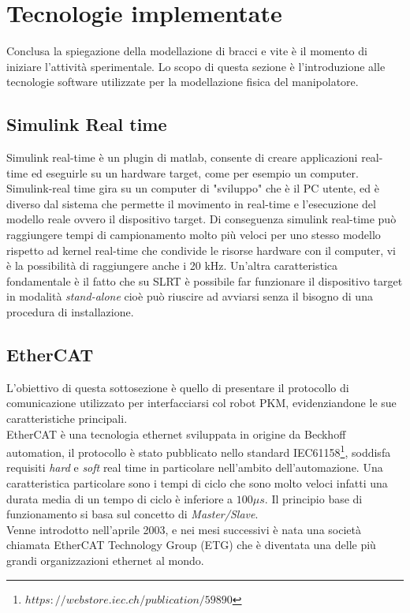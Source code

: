 \section{Tecnologie implementate}
Conclusa la spiegazione della modellazione di bracci e vite è il momento di iniziare l'attività sperimentale. Lo scopo di questa sezione è l'introduzione alle tecnologie software utilizzate per la modellazione fisica del manipolatore.
\subsection{Simulink Real time}
Simulink real-time è un plugin di matlab, consente di creare applicazioni real-time ed eseguirle su un hardware target, come per esempio un computer. Simulink-real time gira su un computer di "sviluppo" che è il PC utente, ed è diverso dal sistema che permette il movimento in real-time e l'esecuzione del modello reale ovvero il dispositivo target. Di conseguenza simulink real-time può raggiungere tempi di campionamento molto più veloci per uno stesso modello rispetto ad kernel real-time che condivide le risorse hardware con il computer, vi è la possibilità di raggiungere anche i 20 kHz. 
Un'altra caratteristica fondamentale è il fatto che su SLRT è possibile far funzionare il dispositivo target in modalità \textit{stand-alone} cioè può riuscire ad avviarsi senza il bisogno di una procedura di installazione. 

\subsection{EtherCAT}
L'obiettivo di questa sottosezione è quello di presentare il protocollo di comunicazione utilizzato per interfacciarsi col robot PKM, evidenziandone le sue caratteristiche principali.\\
EtherCAT è una tecnologia ethernet sviluppata in origine da Beckhoff automation, il protocollo è stato pubblicato nello standard IEC61158\footnote{${https://webstore.iec.ch/publication/59890}$}, soddisfa requisiti \textit{hard} e \textit{soft} real time in particolare nell'ambito dell'automazione. Una caratteristica particolare sono i tempi di ciclo che sono molto veloci infatti una durata media di un tempo di ciclo è inferiore a $100 \mu s$. Il principio base di funzionamento si basa sul concetto di \textit{Master/Slave}.
\\Venne introdotto nell'aprile 2003, e nei mesi successivi è nata una società chiamata EtherCAT Technology Group (ETG) che è diventata una delle più grandi organizzazioni ethernet al mondo.
